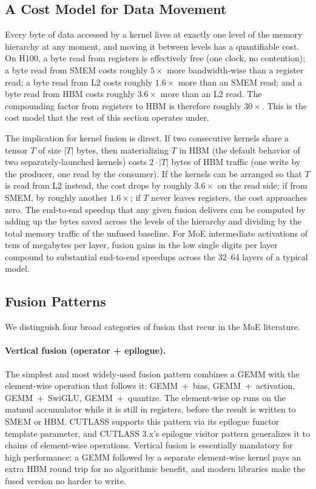 \documentclass[10pt]{article}
\begin{document}
\subsection{A Cost Model for Data Movement}
\label{sec:fusion-costmodel}

Every byte of data accessed by a kernel lives at exactly one level of the memory hierarchy at any moment, and moving it between levels has a quantifiable cost. On H100, a byte read from registers is effectively free (one clock, no contention); a byte read from SMEM costs roughly $5\times$ more bandwidth-wise than a register read; a byte read from L2 costs roughly $1.6\times$ more than an SMEM read; and a byte read from HBM costs roughly $3.6\times$ more than an L2 read. The compounding factor from registers to HBM is therefore roughly $30\times$. This is the cost model that the rest of this section operates under.

The implication for kernel fusion is direct. If two consecutive kernels share a tensor $T$ of size $|T|$ bytes, then materializing $T$ in HBM (the default behavior of two separately-launched kernels) costs $2 \cdot |T|$ bytes of HBM traffic (one write by the producer, one read by the consumer). If the kernels can be arranged so that $T$ is read from L2 instead, the cost drops by roughly $3.6\times$ on the read side; if from SMEM, by roughly another $1.6\times$; if $T$ never leaves registers, the cost approaches zero. The end-to-end speedup that any given fusion delivers can be computed by adding up the bytes saved across the levels of the hierarchy and dividing by the total memory traffic of the unfused baseline. For MoE intermediate activations of tens of megabytes per layer, fusion gains in the low single digits per layer compound to substantial end-to-end speedups across the 32--64 layers of a typical model.

\subsection{Fusion Patterns}
\label{sec:fusion-patterns}

We distinguish four broad categories of fusion that recur in the MoE literature.

\paragraph{Vertical fusion (operator + epilogue).}
The simplest and most widely-used fusion pattern combines a GEMM with the element-wise operation that follows it: GEMM~+~bias, GEMM~+~activation, GEMM~+~SwiGLU, GEMM~+~quantize. The element-wise op runs on the matmul accumulator while it is still in registers, before the result is written to SMEM or HBM. CUTLASS supports this pattern via its epilogue functor template parameter, and CUTLASS 3.x's epilogue visitor pattern generalizes it to chains of element-wise operations. Vertical fusion is essentially mandatory for high performance: a GEMM followed by a separate element-wise kernel pays an extra HBM round trip for no algorithmic benefit, and modern libraries make the fused version no harder to write.
\end{document}
